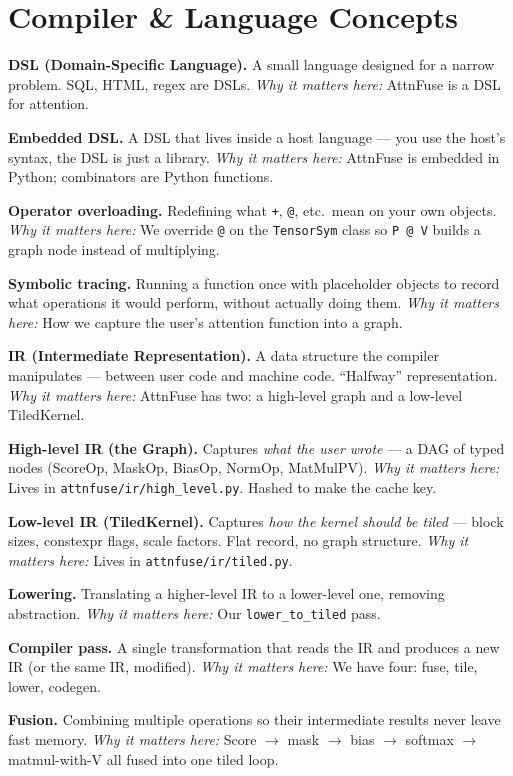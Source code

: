 \documentclass[11pt]{article}
\newcommand{\termw}[3]{%
  \par\smallskip
  \noindent\textbf{\color{blue!50!black}#1.} #2 \emph{\color{black!60}Why it matters here:} #3\par
}
\begin{document}
\section{Compiler \& Language Concepts}

\termw{DSL (Domain-Specific Language)}
{A small language designed for a narrow problem. SQL, HTML, regex are DSLs.}
{AttnFuse is a DSL for attention.}

\termw{Embedded DSL}
{A DSL that lives inside a host language --- you use the host's syntax,
the DSL is just a library.}
{AttnFuse is embedded in Python; combinators are Python functions.}

\termw{Operator overloading}
{Redefining what \texttt{+}, \texttt{@}, etc.\ mean on your own objects.}
{We override \texttt{@} on the \texttt{TensorSym} class so
\texttt{P @ V} builds a graph node instead of multiplying.}

\termw{Symbolic tracing}
{Running a function once with placeholder objects to record what
operations it would perform, without actually doing them.}
{How we capture the user's attention function into a graph.}

\termw{IR (Intermediate Representation)}
{A data structure the compiler manipulates --- between user code and
machine code. ``Halfway'' representation.}
{AttnFuse has two: a high-level graph and a low-level TiledKernel.}

\termw{High-level IR (the Graph)}
{Captures \emph{what the user wrote} --- a DAG of typed nodes
(ScoreOp, MaskOp, BiasOp, NormOp, MatMulPV).}
{Lives in \texttt{attnfuse/ir/high\_level.py}. Hashed to make the cache key.}

\termw{Low-level IR (TiledKernel)}
{Captures \emph{how the kernel should be tiled} --- block sizes,
constexpr flags, scale factors. Flat record, no graph structure.}
{Lives in \texttt{attnfuse/ir/tiled.py}.}

\termw{Lowering}
{Translating a higher-level IR to a lower-level one, removing abstraction.}
{Our \texttt{lower\_to\_tiled} pass.}

\termw{Compiler pass}
{A single transformation that reads the IR and produces a new IR (or the
same IR, modified).}
{We have four: fuse, tile, lower, codegen.}

\termw{Fusion}
{Combining multiple operations so their intermediate results never leave
fast memory.}
{Score $\to$ mask $\to$ bias $\to$ softmax $\to$ matmul-with-V all fused
into one tiled loop.}
\end{document}
